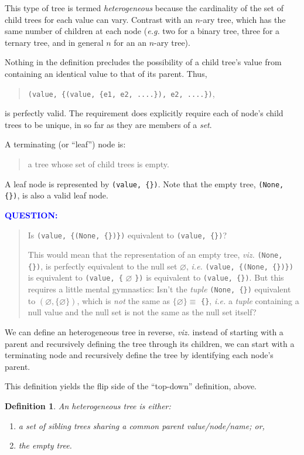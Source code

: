\documentclass[10pt]{amsart}
\numberwithin{equation}{section}
\newtheorem{defn}{Definition}[section]
\begin{document}
This type of tree is termed \emph{heterogeneous} because the cardinality of
the set of child trees for each value can vary. Contrast with 
an $n$-ary tree,
which has the same number of children at each node 
(\emph{e.g.} two for a binary tree, three for a ternary tree, and in general 
\(n\) for an 
an $n$-ary tree).

Nothing in the definition precludes the possibility of a child tree's
value from containing an identical value to that of its parent. Thus,
\begin{quote}
\texttt{(value, \{(value, \{e1, e2, ....\}), e2, ....\})},
\end{quote}
is perfectly valid. The requirement does explicitly require 
each of node's child trees to be unique, in so far as they are members
of a \emph{set}.

A terminating (or ``leaf'') node is:
\begin{quote}
a tree whose set of child trees is empty.
\end{quote}
A leaf node is represented by \texttt{(value, \{\})}.  Note that the empty tree,
\texttt{(None, \{\})}, is also a valid leaf node.

\textcolor{blue}{\bf QUESTION:}
\begin{quote}
Is \texttt{(value, \{(None, \{\})\})} equivalent to \texttt{(value, \{\})}?

This would mean that the representation of an empty tree, \emph{viz.} \texttt{(None, \{\})},
is perfectly equivalent to the null set
$\varnothing$,
\emph{i.e.}
\texttt{(value, \{(None, \{\})\})} is equivalent to 
\texttt{(value, \{}
$\varnothing$
\texttt{\})}
is equivalent to 
\texttt{(value, \{\})}.
But this requires a little mental gymnastics: Isn't the \emph{tuple} 
\texttt{(None, \{\})} equivalent to 
$(\varnothing, \{\varnothing\})$,
which is \emph{not} the same as 
$\{\varnothing\} \equiv$
\texttt{\{\}}, \emph{i.e.} a \emph{tuple} containing a null value and the null set
is not the same as the null set itself?
\end{quote}

We can define an heterogeneous tree in reverse, \emph{viz.} instead of starting
with a parent and recursively defining the tree through its children, we
can start with a terminating node and recursively define the tree 
by identifying each node's parent. 

This definition yields the flip side of the ``top-down'' definition, above.

\begin{defn}
\label{defn:2}
An heterogeneous tree is either:
    \begin{enumerate}
        \item a set of sibling trees sharing a common parent value/node/name; or,
        \item the empty tree.
    \end{enumerate}
\end{defn}
\end{document}
